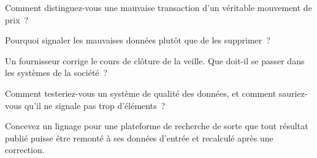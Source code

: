 \begin{interviewq}\label{iq:pl:data-quality-and-lineage:2}
Comment distinguez-vous une mauvaise transaction d'un véritable mouvement de prix~?
\end{interviewq}

\begin{interviewq}\label{iq:pl:data-quality-and-lineage:3}
Pourquoi signaler les mauvaises données plutôt que de les supprimer~?
\end{interviewq}

\begin{interviewq}\label{iq:pl:data-quality-and-lineage:4}
Un fournisseur corrige le cours de clôture de la veille. Que doit-il se passer dans les systèmes de la société~?
\end{interviewq}

\begin{interviewq}\label{iq:pl:data-quality-and-lineage:5}
Comment testeriez-vous un système de qualité des données, et comment sauriez-vous qu'il ne signale pas trop d'éléments~?
\end{interviewq}

\begin{interviewq}\label{iq:pl:data-quality-and-lineage:6}
Concevez un lignage pour une plateforme de recherche de sorte que tout résultat publié puisse être remonté à ses données d'entrée et recalculé après une correction.
\end{interviewq}
